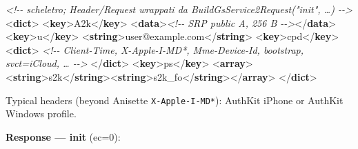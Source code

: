 \documentclass[
  english,
  10pt]{article}
\newenvironment{Shaded}{}{}
\newcommand{\CommentTok}[1]{\textcolor[rgb]{0.38,0.63,0.69}{\textit{#1}}}
\newcommand{\KeywordTok}[1]{\textcolor[rgb]{0.00,0.44,0.13}{\textbf{#1}}}
\newcommand{\NormalTok}[1]{#1}
\begin{document}
\begin{Shaded}
\begin{Highlighting}[]
\CommentTok{\textless{}!{-}{-} scheletro; Header/Request wrappati da BuildGsService2Request("init", …) {-}{-}\textgreater{}}
\NormalTok{\textless{}}\KeywordTok{dict}\NormalTok{\textgreater{}}
\NormalTok{  \textless{}}\KeywordTok{key}\NormalTok{\textgreater{}A2k\textless{}/}\KeywordTok{key}\NormalTok{\textgreater{} \textless{}}\KeywordTok{data}\NormalTok{\textgreater{}}\CommentTok{\textless{}!{-}{-} SRP public A, 256 B {-}{-}\textgreater{}}\NormalTok{\textless{}/}\KeywordTok{data}\NormalTok{\textgreater{}}
\NormalTok{  \textless{}}\KeywordTok{key}\NormalTok{\textgreater{}u\textless{}/}\KeywordTok{key}\NormalTok{\textgreater{}   \textless{}}\KeywordTok{string}\NormalTok{\textgreater{}user@example.com\textless{}/}\KeywordTok{string}\NormalTok{\textgreater{}}
\NormalTok{  \textless{}}\KeywordTok{key}\NormalTok{\textgreater{}cpd\textless{}/}\KeywordTok{key}\NormalTok{\textgreater{} \textless{}}\KeywordTok{dict}\NormalTok{\textgreater{}}
    \CommentTok{\textless{}!{-}{-} Client{-}Time, X{-}Apple{-}I{-}MD*, Mme{-}Device{-}Id, bootstrap, svct=iCloud, … {-}{-}\textgreater{}}
\NormalTok{  \textless{}/}\KeywordTok{dict}\NormalTok{\textgreater{}}
\NormalTok{  \textless{}}\KeywordTok{key}\NormalTok{\textgreater{}ps\textless{}/}\KeywordTok{key}\NormalTok{\textgreater{}  \textless{}}\KeywordTok{array}\NormalTok{\textgreater{}\textless{}}\KeywordTok{string}\NormalTok{\textgreater{}s2k\textless{}/}\KeywordTok{string}\NormalTok{\textgreater{}\textless{}}\KeywordTok{string}\NormalTok{\textgreater{}s2k\_fo\textless{}/}\KeywordTok{string}\NormalTok{\textgreater{}\textless{}/}\KeywordTok{array}\NormalTok{\textgreater{}}
\NormalTok{\textless{}/}\KeywordTok{dict}\NormalTok{\textgreater{}}
\end{Highlighting}
\end{Shaded}

Typical headers (beyond Anisette \texttt{X-Apple-I-MD*}): AuthKit iPhone
or AuthKit Windows profile.

\textbf{Response --- init} (ec=0):
\end{document}

